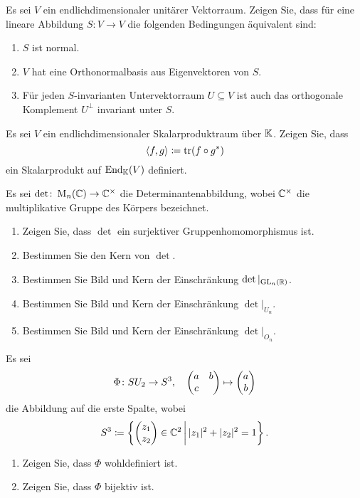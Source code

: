 \documentclass[a4paper,10pt]{scrartcl}
\begin{document}
\begin{question}
  Es sei $V$ ein endlichdimensionaler unitärer Vektorraum.
  Zeigen Sie, dass für eine lineare Abbildung $S \colon V \to V$ die folgenden Bedingungen äquivalent sind:
  \begin{enumerate}
    \item
      $S$ ist normal.
    \item
      $V$ hat eine Orthonormalbasis aus Eigenvektoren von $S$.
    \item
      Für jeden $S$-invarianten Untervektorraum $U \subseteq V$ ist auch das orthogonale Komplement $U^\perp$ invariant unter $S$.
  \end{enumerate}
\end{question}


\begin{question}
  Es sei $V$ ein endlichdimensionaler Skalarproduktraum über $\mathbb{K}$.
  Zeigen Sie, dass
  \[
    \langle f, g \rangle \coloneqq \operatorname{tr}(f \circ g^*)
  \]
  ein Skalarprodukt auf $\operatorname{End}_{\mathbb{K}}(V)$ definiert.
\end{question}


\begin{question}
  Es sei $\det \colon \operatorname{M}_n(\mathbb{C}) \to \mathbb{C}^\times$ die Determinantenabbildung, wobei $\mathbb{C}^\times$ die multiplikative Gruppe des Körpers bezeichnet.
  \begin{enumerate}
    \item
      Zeigen Sie, dass $\det$ ein surjektiver Gruppenhomomorphismus ist.
    \item
      Bestimmen Sie den Kern von $\det$.
    \item
      Bestimmen Sie Bild und Kern der Einschränkung $\det|_{\operatorname{GL}_n(\mathbb{R})}$.
    \item
      Bestimmen Sie Bild und Kern der Einschränkung $\det|_{U_n}$.
    \item
      Bestimmen Sie Bild und Kern der Einschränkung $\det|_{O_n}$.
  \end{enumerate}
\end{question}


\begin{question}
  Es sei
  \[
    \Phi \colon SU_2 \to S^3,
    \quad
    \begin{pmatrix}
      a & b \\
      c & 
    \end{pmatrix}
    \mapsto
    \begin{pmatrix} a \\ b \end{pmatrix}
  \]
  die Abbildung auf die erste Spalte, wobei
  \[
              S^3
    \coloneqq \left\{ \begin{pmatrix} z_1 \\ z_2 \end{pmatrix} \in \mathbb{C}^2 \,\middle|\, |z_1|^2 + |z_2|^2 = 1 \right\}.
  \]
  \begin{enumerate}
    \item
      Zeigen Sie, dass $\Phi$ wohldefiniert ist.
    \item
      Zeigen Sie, dass $\Phi$ bijektiv ist.
  \end{enumerate}
\end{question}
\end{document}
